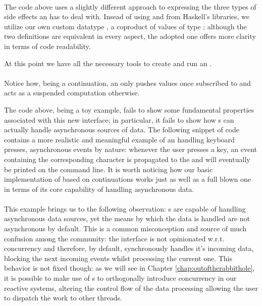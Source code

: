 \\

The code above uses a slightly different approach to expressing the three types of side effects an  has to deal with. Insead of using  and  from Haskell's libraries, we utilize our own custom datatype , a coproduct of values of type ; although the two definitions are equivalent in every aspect, the adopted one offers more clarity in terms of code readability.

At this point we have all the necessary tools to create and run an .\\

\\

Notice how, being a continuation, an  only pushes values once subscribed to and acts as a suspended computation otherwise. 

The code above, being a toy example, fails to show some fundamental properties associated with this new interface; in particular, it fails to show how s can actually handle asynchronous sources of data. The following snippet of code contains a more realistic and meaningful example of an  handling keyboard presses, asynchronous events by nature: whenever the user presses a key, an event containing the corresponding character is propagated to the  and will eventually be printed on the command line. It is worth noticing how our basic implementation of  based on continuations works just as well as a full blown one in terms of its core capability of handling asynchronous data.\\ 

\\

This example brings us to the following observation: s are capable of handling asynchronous data sources, yet the means by which the data is handled are not asynchronous by default. This is a common misconception and source of much confusion among the community: the  interface is not opinionated w.r.t. concurrency and therefore, by default, synchronously handles it's incoming data, blocking the next incoming events whilst processing the current one. This behavior is not fixed though: as we will see in Chapter \ref{chap:outoftherabbithole}, it is possible to make use of s to orthogonally introduce concurrency in our reactive systems, altering the control flow of the data processing allowing the user to dispatch the work to other threads.

